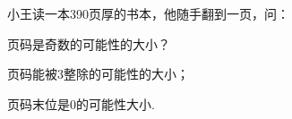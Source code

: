 小王读一本390页厚的书本，他随手翻到一页，问：

\begin{subquestions}

    \subquestion 页码是奇数的可能性的大小？

    \subquestion 页码能被3整除的可能性的大小；

    \subquestion 页码末位是0的可能性大小.

\end{subquestions}





